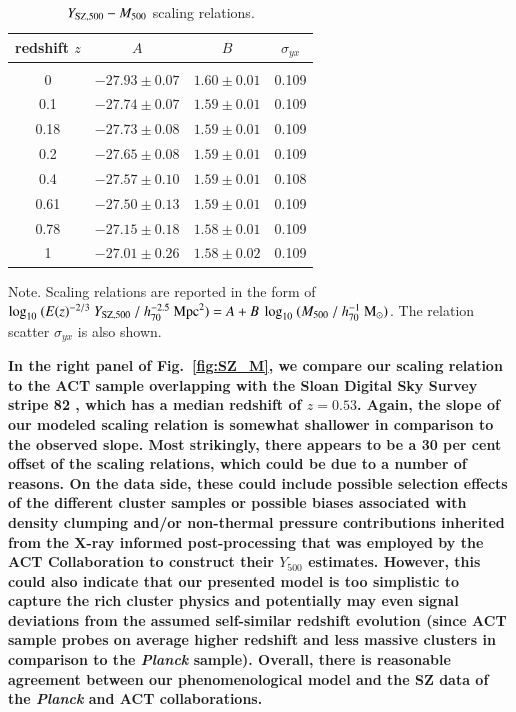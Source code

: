 \documentclass[useAMS,usenatbib]{mn2e}
\begin{document}
\begin{table} 
\begin{center}
\caption{$Y_{{\mathrm{SZ}}, 500}-M_{500}$ scaling relations.}
\medskip
\begin{tabular}{cccc}
\hline
\phantom{\Big|}
redshift $z$ & $A$ & $B$ & $\sigma_{yx}$ \\
\hline\\[-0.5em]
 0      & $-27.93\pm0.07$ & $1.60\pm0.01$ & 0.109\\
 0.1   & $-27.74\pm0.07$ & $1.59\pm0.01$ & 0.109\\
 0.18 & $-27.73\pm0.08$ & $1.59\pm0.01$ & 0.109\\
 0.2   & $-27.65\pm0.08$ & $1.59\pm0.01$ & 0.109\\ 
 0.4   & $-27.57\pm0.10$ & $1.59\pm0.01$ & 0.108\\ 
 0.61 & $-27.50\pm0.13$ & $1.59\pm0.01$ & 0.109\\ 
 0.78 & $-27.15\pm0.18$ & $1.58\pm0.01$ & 0.109\\ 
 1      & $-27.01\pm0.26$ & $1.58\pm0.02$ & 0.109\\[0.5em] 
\hline
\end{tabular}
\label{tab:YSZfits}
\end{center}
\footnotesize{Note. Scaling relations are reported in the form of $\log_{10}~(E(z)^{-2/3}~Y_{{\mathrm{SZ}},500}~/~h_{70}^{-2.5}~{\mathrm{Mpc}}^{2})=A+B~\log_{10}~(M_{500}~/~h_{70}^{-1}~{\mathrm{M_{\odot}}})$. The relation scatter $\sigma_{yx}$ is also shown.}
\end{table}

{\bf In the right panel of Fig.~\ref{fig:SZ_M}, we compare our scaling relation
  to the ACT sample overlapping with the Sloan Digital Sky Survey stripe 82
  \citep{2013JCAP...07..008H}, which has a median redshift of $z=0.53$. Again,
  the slope of our modeled scaling relation is somewhat shallower in comparison
  to the observed slope. Most strikingly, there appears to be a 30 per cent
  offset of the scaling relations, which could be due to a number of reasons. On
  the data side, these could include possible selection effects of the different
  cluster samples or possible biases associated with density clumping and/or
  non-thermal pressure contributions inherited from the X-ray informed
  post-processing that was employed by the ACT Collaboration to construct their
  $Y_{500}$ estimates. However, this could also indicate that our presented
  model is too simplistic to capture the rich cluster physics and potentially
  may even signal deviations from the assumed self-similar redshift evolution
  (since ACT sample probes on average higher redshift and less massive clusters
  in comparison to the {\em Planck} sample). Overall, there is reasonable
  agreement between our phenomenological model and the SZ data of the
  \emph{Planck} and ACT collaborations.}
 
\end{document}

